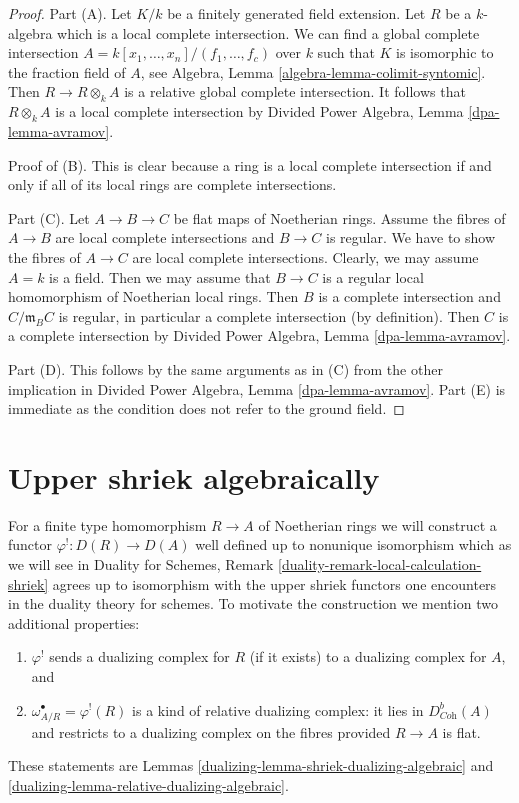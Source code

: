 \begin{proof}
Part (A). Let $K/k$ be a finitely generated field extension.
Let $R$ be a $k$-algebra which is a local complete intersection.
We can find a global complete intersection
$A = k[x_1, \ldots, x_n]/(f_1, \ldots, f_c)$
over $k$ such that $K$ is isomorphic to the fraction field of $A$, see
Algebra, Lemma \ref{algebra-lemma-colimit-syntomic}.
Then $R \to R \otimes_k A$ is a relative global complete intersection.
It follows that $R \otimes_k A$ is a local complete intersection
by Divided Power Algebra, Lemma \ref{dpa-lemma-avramov}.

\medskip\noindent
Proof of (B). This is clear
because a ring is a local complete intersection if and only if all of its
local rings are complete intersections.

\medskip\noindent
Part (C). Let $A \to B \to C$ be flat maps of Noetherian rings.
Assume the fibres of $A \to B$ are local complete intersections
and $B \to C$ is regular. We have to show the fibres of $A \to C$
are local complete intersections. Clearly, we may assume $A = k$ is a field.
Then we may assume that $B \to C$ is a regular local homomorphism
of Noetherian local rings. Then $B$ is a complete intersection and
$C/\mathfrak m_B C$ is regular, in particular a complete intersection
(by definition). Then $C$ is a complete intersection by
Divided Power Algebra, Lemma \ref{dpa-lemma-avramov}.

\medskip\noindent
Part (D). This follows by the same arguments as in (C) from
the other implication in
Divided Power Algebra, Lemma \ref{dpa-lemma-avramov}.
Part (E) is immediate as the condition does not refer to the ground
field.
\end{proof}

\section{Upper shriek algebraically}
\label{dualizing-section-relative-dualizing-complex-algebraic}
For a finite type homomorphism $R \to A$ of Noetherian rings
we will construct a functor $\varphi^! : D(R) \to D(A)$
well defined up to nonunique isomorphism which
as we will see in Duality for Schemes, Remark
\ref{duality-remark-local-calculation-shriek}
agrees up to isomorphism with the upper shriek functors
one encounters in the duality theory for schemes.
To motivate the construction we mention two additional properties:
\begin{enumerate}
\item $\varphi^!$ sends a dualizing complex for $R$ (if it exists)
to a dualizing complex for $A$, and
\item $\omega_{A/R}^\bullet = \varphi^!(R)$ is a kind of
relative dualizing complex: it lies in $D^b_{\textit{Coh}}(A)$ and restricts
to a dualizing complex on the fibres provided $R \to A$ is flat.
\end{enumerate}
These statements are Lemmas \ref{dualizing-lemma-shriek-dualizing-algebraic} and
\ref{dualizing-lemma-relative-dualizing-algebraic}.

